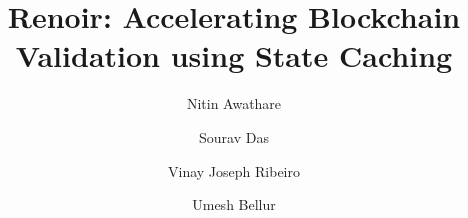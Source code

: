 \documentclass[sigconf]{acmart}
\newcommand{\prot}{{\sc Renoir}}
\theoremstyle{definition}
\begin{document}
\title{\prot: Accelerating Blockchain Validation  using State Caching}






\author{Nitin Awathare}
 
\author{Sourav Das}

\author{Vinay Joseph Ribeiro}

\author{Umesh Bellur}


\end{document}
